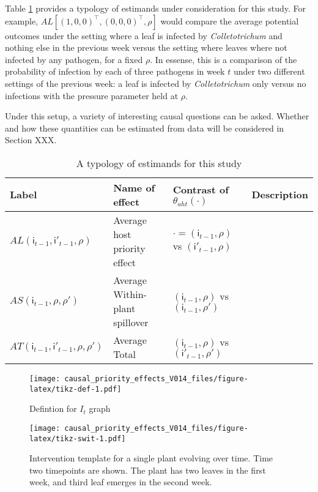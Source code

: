 \documentclass[]{article}
\begin{document}
Table \ref{tab:estimands} provides a typology of estimands under
consideration for this study. For example,
\(AL[(1, 0, 0)^{\intercal}, (0, 0, 0)^{\intercal}, \rho]\) would compare
the average potential outcomes under the setting where a leaf is
infected by \emph{Colletotrichum} and nothing else in the previous week
versus the setting where leaves where not infected by any pathogen, for
a fixed \(\rho\). In essense, this is a comparison of the probability of
infection by each of three pathogens in week \(t\) under two different
settings of the previous week: a leaf is infected by
\emph{Colletotrichum} only versus no infections with the pressure
parameter held at \(\rho\).

Under this setup, a variety of interesting causal questions can be
asked. Whether and how these quantities can be estimated from data will
be considered in Section XXX.

\begin{table}[H]
\caption{A typology of estimands for this study}
\label{tab:estimands}
\begin{tabular}{llll}
Label & Name of effect & Contrast of $\theta_{aht}(\cdot)$ & Description \\
\hline
$AL(\mathsf{i}_{t-1}, \mathsf{i}'_{t-1}, \rho)$ & Average host priority effect &  $\cdot = (\mathsf{i}_{t-1}, \rho)$ vs $(\mathsf{i}'_{t-1}, \rho)$ & \\
$AS(\mathsf{i}_{t-1}, \rho, \rho')$ & Average Within-plant spillover & $(\mathsf{i}_{t-1}, \rho)$ vs $(\mathsf{i}_{t-1}, \rho')$ & \\
$AT(\mathsf{i}_{t-1}, \mathsf{i}'_{t-1}, \rho, \rho')$  & Average Total & $(\mathsf{i}_{t-1}, \rho)$ vs $(\mathsf{i}'_{t-1}, \rho')$ & \\
\end{tabular}
\end{table}

\begin{figure}
\centering
\texttt{[image: causal\_priority\_effects\_V014\_files/figure-latex/tikz-def-1.pdf]}
\caption{Defintion for \(I_t\) graph}
\end{figure}

\begin{figure}
\centering
\texttt{[image: causal\_priority\_effects\_V014\_files/figure-latex/tikz-swit-1.pdf]}
\caption{Intervention template for a single plant evolving over time.
Time two timepoints are shown. The plant has two leaves in the first
week, and third leaf emerges in the second week.}
\end{figure}
\end{document}
